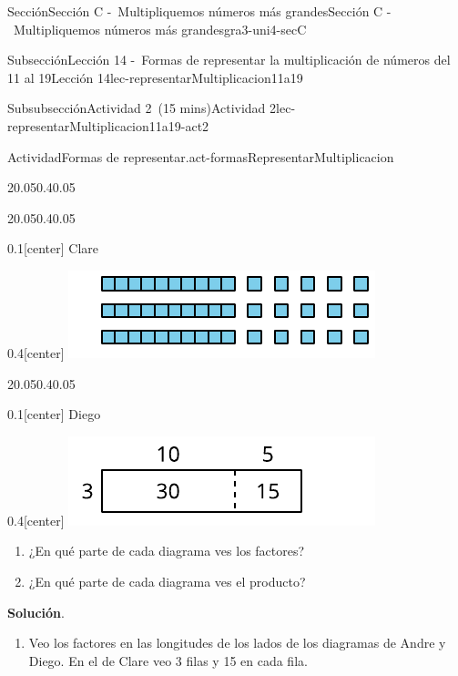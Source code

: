 \documentclass[oneside,10pt,]{article}
\newcommand{\blocktitlefont}{\relax}
\begin{document}
\begin{sectionptx}{Sección}{Sección C -~Multipliquemos números más grandes}{}{Sección C -~Multipliquemos números más grandes}{}{}{gra3-uni4-secC}
\begin{subsectionptx}{Subsección}{Lección 14 -~Formas de representar la multiplicación de números del 11 al 19}{}{Lección 14}{}{}{lec-representarMultiplicacion11a19}
\begin{subsubsectionptx}{Subsubsección}{Actividad 2~(15 mins)}{}{Actividad 2}{}{}{lec-representarMultiplicacion11a19-act2}
\begin{activity}{Actividad}{Formas de representar.}{act-formasRepresentarMultiplicacion}
\begin{sidebyside}{2}{0.05}{0.4}{0.05}
\end{sidebyside}%
\begin{sidebyside}{2}{0.05}{0.4}{0.05}%
\begin{sbspanel}{0.1}[center]%
Clare%
\end{sbspanel}%
\begin{sbspanel}{0.4}[center]%
\includegraphics[width=\linewidth]{external/svg-source/tikz-file-147552-scale13.pdf}
\end{sbspanel}%
\end{sidebyside}%
\begin{sidebyside}{2}{0.05}{0.4}{0.05}%
\begin{sbspanel}{0.1}[center]%
Diego%
\end{sbspanel}%
\begin{sbspanel}{0.4}[center]%
\includegraphics[width=\linewidth]{external/svg-source/tikz-file-147553-scale13.pdf}
\end{sbspanel}%
\end{sidebyside}%
%
\begin{enumerate}
\item{}¿En qué parte de cada diagrama ves los factores?%
\item{}¿En qué parte de cada diagrama ves el producto?%
\end{enumerate}
\par\smallskip%
\noindent\textbf{\blocktitlefont Solución}.\hypertarget{act-formasRepresentarMultiplicacion-3}{}\quad{}%
\begin{enumerate}
\item{}Veo los factores en las longitudes de los lados de los diagramas de Andre y Diego. En el de Clare veo 3 filas y 15 en cada fila.%

\end{enumerate}
\end{activity}
\end{subsubsectionptx}
\end{subsectionptx}
\end{sectionptx}
\end{document}
